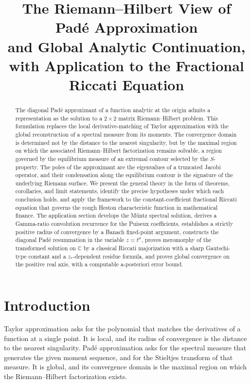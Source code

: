 \documentclass[11pt]{article}
\title{The Riemann--Hilbert View of Pad\'e Approximation\\
and Global Analytic Continuation,\\
with Application to the Fractional Riccati Equation}
\author{}
\date{}
\theoremstyle{definition}
\theoremstyle{remark}
\begin{document}
\maketitle

\begin{abstract}
The diagonal Pad\'e approximant of a function analytic at the origin admits a representation as the solution to a $2\times 2$ matrix Riemann--Hilbert problem. This formulation replaces the local derivative-matching of Taylor approximation with the global reconstruction of a spectral measure from its moments. The convergence domain is determined not by the distance to the nearest singularity, but by the maximal region on which the associated Riemann--Hilbert factorization remains solvable, a region governed by the equilibrium measure of an extremal contour selected by the $S$-property. The poles of the approximant are the eigenvalues of a truncated Jacobi operator, and their condensation along the equilibrium contour is the signature of the underlying Riemann surface. We present the general theory in the form of theorems, corollaries, and limit statements, identify the precise hypotheses under which each conclusion holds, and apply the framework to the constant-coefficient fractional Riccati equation that governs the rough Heston characteristic function in mathematical finance. The application section develops the M\"untz spectral solution, derives a Gamma-ratio convolution recurrence for the Puiseux coefficients, establishes a strictly positive radius of convergence by a Banach fixed-point argument, constructs the diagonal Pad\'e resummation in the variable $z = t^{\mu}$, proves meromorphy of the transformed solution on $\mathbb{C}$ by a classical Riccati majorization with a sharp Gautschi-type constant and a $z_{*}$-dependent residue formula, and proves global convergence on the positive real axis, with a computable a-posteriori error bound.
\end{abstract}

\tableofcontents

\section{Introduction}
\label{sec:intro}

Taylor approximation asks for the polynomial that matches the derivatives of a function at a single point. It is local, and its radius of convergence is the distance to the nearest singularity. Pad\'e approximation asks for the spectral measure that generates the given moment sequence, and for the Stieltjes transform of that measure. It is global, and its convergence domain is the maximal region on which the Riemann--Hilbert factorization exists.
\end{document}
